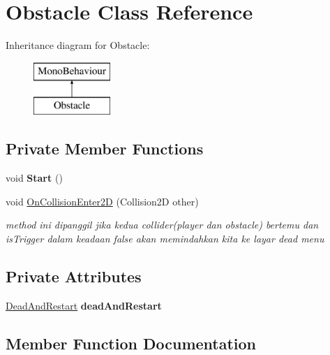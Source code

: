 \hypertarget{class_obstacle}{}\section{Obstacle Class Reference}
\label{class_obstacle}
Inheritance diagram for Obstacle\+:\begin{figure}[H]
\begin{center}
\leavevmode
\includegraphics[height=2.000000cm]{class_obstacle}
\end{center}
\end{figure}
\subsection*{Private Member Functions}
\begin{DoxyCompactItemize}
\item 
\hypertarget{class_obstacle_adf2ba97f98b9caacbfb72675371462b0}{}\label{class_obstacle_adf2ba97f98b9caacbfb72675371462b0} 
void {\bfseries Start} ()
\item 
void \hyperlink{class_obstacle_ae0ab8556d9d584f572f1f20de2ba2890}{On\+Collision\+Enter2D} (Collision2D other)
\begin{DoxyCompactList}\small\item\em method ini dipanggil jika kedua collider(player dan obstacle) bertemu dan is\+Trigger dalam keadaan false akan memindahkan kita ke layar dead menu \end{DoxyCompactList}\end{DoxyCompactItemize}
\subsection*{Private Attributes}
\begin{DoxyCompactItemize}
\item 
\hypertarget{class_obstacle_a7c34306ff45610bfbac6aab123841c21}{}\label{class_obstacle_a7c34306ff45610bfbac6aab123841c21} 
\hyperlink{class_dead_and_restart}{Dead\+And\+Restart} {\bfseries dead\+And\+Restart}
\end{DoxyCompactItemize}


\subsection{Member Function Documentation}
\hypertarget{class_obstacle_ae0ab8556d9d584f572f1f20de2ba2890}{}\label{class_obstacle_ae0ab8556d9d584f572f1f20de2ba2890} 
